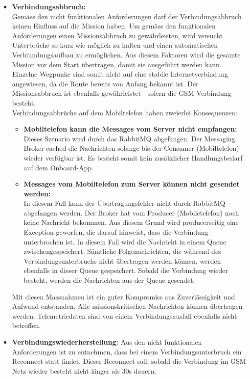 \begin{itemize}
	\item{\textbf{Verbindungsabbruch:} \\
		Gemäss den nicht funktionalen Anforderungen darf der Verbindungsabbruch keinen Einfluss auf die Mission haben. Um gemäss den funktionalen Anforderungen einen Missionsabbruch zu gewährleisten, wird versucht Unterbrüche so kurz wie möglich zu halten und einen automatischen Verbiundungsaufbau zu ermöglichen. Aus diesem Faktoren wird die gesamte Mission vor dem Start übertragen, damit sie ausgeführt werden kann. Einzelne Wegpunke sind somit nicht auf eine stabile Internetverbindung angewiesen, da die Route bereits von Anfang bekannt ist. Der Missionsabbruch ist ebenfalls gewährleistet - sofern die GSM Verbindung besteht. 
		\\
		Verbindungsabbrüche auf dem Mobiltelefon haben zweierlei Konsequenzen:	
		\begin{itemize}
			\item{\textbf{Mobiltelefon kann die Messages vom Server nicht empfangen:} \\
				Dieses Szenario wird durch das RabbitMQ abgefangen. Der Messaging Broker cached die Nachrichten solange bis der Consumer (Mobiltelefon) wieder verfügbar ist. Es besteht somit kein zusätzlicher Handlungsbedarf auf dem Onboard-App.
			}
			\item{\textbf{Messages vom Mobiltelefon zum Server können nicht gesendet werden:} \\
				In diesem Fall kann der Übertragungsfehler nicht durch RabbitMQ abgefangen werden. Der Broker hat vom Producer (Mobiletelefon) noch keine Nachricht bekommen. Aus diesem Grund wird producerseitig eine Exception geworfen, die darauf hinweist, dass die Verbindung unterbrochen ist. In diesem Fall wird die Nachricht in einem Queue zwischengespeichert. Sämtliche Folgenachrichten, die während des Verbindungsunterbruchs nicht übertragen werden können, werden ebenfalls in dieser Queue gespeichert. Sobald die Verbindung wieder besteht, werden die Nachrichten aus der Queue gesendet.
			}
		\end{itemize}
		Mit diesen Massnahmen ist ein guter Kompromiss aus Zuverlässigkeit und Aufwand entstanden. Alle missionskritischen Nachrichten können übertragen werden. Telemetriedaten sind von einem Verbindungsausfall ebenfalls nicht betroffen.
	}
	\item{\textbf{Verbindungswiederherstellung:}
		Aus den nicht funktionalen Anforderungen ist zu entnehmen, dass bei einem Verbindungsunterbruch ein Reconnect statt findet. Dieser Reconnect soll, sobald die Verbindung im GSM Netz wieder besteht nicht länger als 30s dauern. \\
}
\end{itemize}
